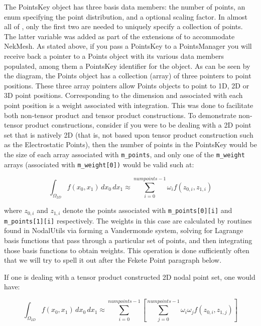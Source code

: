 The PointsKey object has three basis data members: the number of points, an enum specifying the point distribution, and a optional
scaling factor.  In almost all of {\nek}, only the first two are needed to uniquely specify a collection of points.  The latter variable was
added as part of the extensions of {\nek} to accommodate NekMesh.  As stated above, if you pass a PointsKey to a PointsManager
you will receive back a pointer to a Points object with its various data members populated, among them a PointsKey identifier for the
object.  As can be seen by the diagram, the Points object has a collection (array) of three pointers to point positions.  These three
array pointers allow Points objects to point to 1D, 2D or 3D point positions.  Corresponding to the dimension and associated with each
point position is a weight associated with integration.  This was done to facilitate both non-tensor product and tensor product constructions. 
To demonstrate non-tensor product constructions, consider if you were 
to be dealing with a 2D point set that is natively 2D (that is, not based upon tensor product construction such
as the Electrostatic Points), then the number
of points in the PointsKey would be the size of each array associated with \verb+m_points+, and only one of the \verb+m_weight+ 
arrays (associated with \verb+m_weight[0])+ would be valid such at:

\[
\int_{\Omega_{2D}} f(x_{0},x_{1}) \, dx_0\,dx_1 \approx \sum_{i=0}^{numpoints-1} \omega_i f(z_{0,i},z_{1,i})
\]

\noindent where $z_{0,i}$ and $z_{1,i}$ denote the points associated with \verb+m_points[0][i]+ and \verb+m_points[1][i]+ respectively.
The weights in this case are calculated by routines found in NodalUtils via forming a Vandermonde system, solving for Lagrange
basis functions that pass through a particular set of points, and then integrating those basis functions to obtain weights. 
This operation is done sufficiently often that we will try to spell it out after the Fekete Point paragraph below.  

If one is dealing with a tensor product constructed 2D nodal point set, one would have:

\[
\int_{\Omega_{2D}} f(x_{0},x_{1}) \, dx_0\,dx_1 \approx \sum_{i=0}^{numpoints-1} \left[ \sum_{j=0}^{numpoints-1} \omega_i \omega_j f(z_{0,i},z_{1,j})\right]
\]

